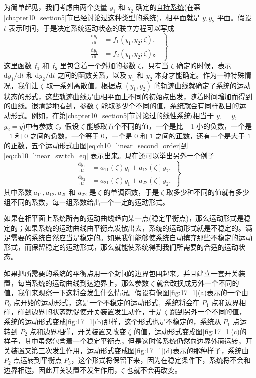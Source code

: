 为简单起见，我们考虑由两个变量 $y_1$ 和 $y_2$ 确定的\underline{自持系统}(在第\ref{chapter10_section5}节已经讨论过这种类型的系统)，相平面就是 $y_1y_2$ 平面。假设 $t$ 表示时间，于是决定系统运动状态的联立方程可以写成
\begin{equation}
\left.
\begin{aligned}
\frac{\mathrm{d}y_1}{\mathrm{d}t} &= f_1(y_1,y_2;\zeta), \\
\frac{\mathrm{d}y_2}{\mathrm{d}t} &= f_2(y_1,y_2;\zeta)。
\end{aligned}
\right\}
\label{eq:ch17_two_var_selfsustained_system}
\end{equation}
这里函数 $f_1$ 和 $f_2$ 里包含着一个外加的参数 $\zeta$，只有当 $\zeta$ 确定的时候，表示 $\mathrm{d}y_1/\mathrm{d}t$ 和 $\mathrm{d}y_2/\mathrm{d}t$ 之间的函数关系，以及 $y_1$ 和 $y_2$ 本身才能确定。作为一种特殊情况，我们让 $\zeta$ 取一系列离散值。根据点 $(y_1,y_2)$ 的轨迹曲线就确定了系统的运动状态的形式，这些轨迹曲线是由相平面上不同的初始点出发，随着时间增加而得到的曲线。很清楚地看到，参数 $\zeta$ 能取多少个不同的值，系统就会有同样数目的运动形式。例如，在第\ref{chapter10_section5}节讨论过的线性系统(相当于 $y_1=y$, $y_2=\dot{y}$)中有参数 $\zeta$，假设 $\zeta$ 能够取五个不同的值，一个是比 $-1$ 小的负数，一个是 $-1$ 和 $0$ 之间的负数，一个等于 $0$，一个是 $0$ 和 $1$ 之间的正数，还有一个是大于 $1$ 的正数，五个运动形式由图\eqref{eq:ch10_linear_second_order}到\eqref{eq:ch10_linear_switch_eq} 表示出来。现在还可以举出另外一个例子
\begin{equation}
\left.
\begin{aligned}
\frac{\mathrm{d}y_1}{\mathrm{d}t} &= a_{11}(\zeta)y_1 + a_{12}(\zeta)y_2, \\
\frac{\mathrm{d}y_2}{\mathrm{d}t} &= a_{21}(\zeta)y_1 + a_{22}(\zeta)y_2,
\end{aligned}
\right\}
\label{eq:ch17_linear_two_var_system}
\end{equation}
其中系数 $a_{11},a_{12},a_{21}$ 和 $a_{22}$ 是 $\zeta$ 的单调函数，于是 $\zeta$ 取多少种不同的值就有多少组不同的系数，每一组系数给出一个一定的运动形式。

如果在相平面上系统所有的运动曲线趋向某一点(稳定平衡点)，那么运动形式是稳定的；如果系统的运动曲线由平衡点发散出去，系统的运动形式就是不稳定的。满足需要的系统自然应当是稳定的。如果我们能够使系统自动摈弃那些不稳定的运动形式，而保留稳定的运动形式，那么就能使系统得到我们所需要的合适的运动状态。

如果把所需要的系统的平衡点用一个封闭的边界包围起来，并且建立一套开关装置，每当系统的运动曲线到达边界上，那么参数 $\zeta$ 就会改换成另外一个不同的值，我们来观察一下这将会发生什么情况。假设有像图\ref{fig:17_1}(a)表示的一个由 $P_0$ 点开始的运动形式，这是一个不稳定的运动形式，系统将会在 $P_1$ 点和边界相碰，碰到边界的状态就促使开关装置发生动作，于是 $\zeta$ 跳到另外一个不同的值，系统的运动形式变成\ref{fig:17_1}(b)那样，这个形式也是不稳定的，系统从 $P_1$ 点运转到 $P_2$ 点和边界相碰，开关装置又改变 $\zeta$ 的值，运动形式变成图\ref{fig:17_1}(c)的样子，其中虽然包含着一个稳定平衡点，但是这时候系统仍然向边界外面运转，开关装置又第三次发生作用，运动形式变成图\ref{fig:17_1}(d)表示的那种样子，系统由 $P_2$ 点运转到平衡点 $P_3$，这个形式将保留下来，因为在稳定条件下，系统将不会和边界相碰，因此开关装置不发生作用，$\zeta$ 也就不会再改变。

